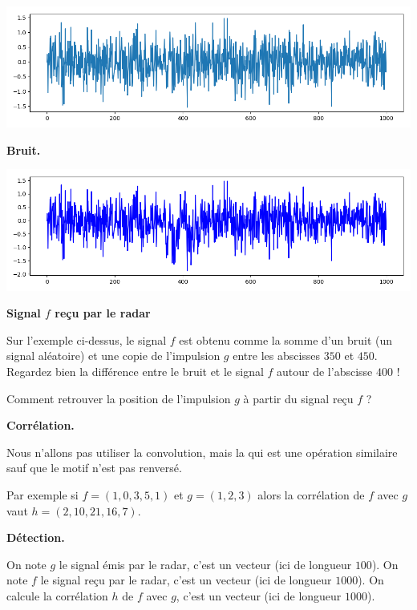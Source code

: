 \documentclass[11pt,class=report,crop=false]{standalone}
\begin{document}
\begin{center}
\includegraphics[scale=\myscale,scale=0.5]{figures/correlation1d-2}

\textbf{Bruit.}
\end{center}

\begin{center}
\includegraphics[scale=\myscale,scale=0.5]{figures/correlation1d-3}

\textbf{Signal $f$ reçu par le radar}
\end{center}

Sur l'exemple ci-dessus, le signal $f$ est obtenu comme la somme d'un bruit (un signal aléatoire) et une copie de l'impulsion $g$ entre les abscisses $350$ et $450$. Regardez bien la différence entre le bruit et le signal $f$ autour de l'abscisse $400$ !

Comment retrouver la position de l'impulsion $g$ à partir du signal reçu $f$ ?

\bigskip
\textbf{Corrélation.}

Nous n'allons pas utiliser la convolution, mais la  qui est une opération similaire sauf que le motif n'est pas renversé.

Par exemple si $f =  (1, 0, 3, 5, 1)$ et $g = (1, 2, 3)$ alors la corrélation de $f$ avec $g$ vaut $h = (2, 10, 21, 16,  7)$.

\bigskip
\textbf{Détection.}

On note $g$ le signal émis par le radar, c'est un vecteur (ici de longueur $100$).
On note $f$ le signal reçu par le radar, c'est un vecteur (ici de longueur $1000$).
On calcule la corrélation $h$  de $f$ avec $g$, c'est un vecteur (ici de longueur $1000$).
\end{document}
